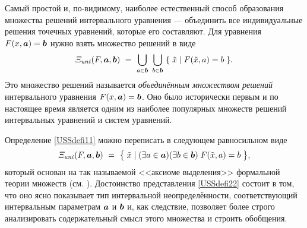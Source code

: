 \documentclass[a5paper,openany]{book}
\newcommand{\mbf}[1]{\protect\text{\boldmath$#1$}}
\newcommand{\USS}{\varXi_\mathit{\hspace{-0.5pt}uni}}
\begin{document}
Самый простой и, по-видимому, наиболее естественный способ образования множества 
решений интервального уравнения --- объединить все индивидуальные решения точечных 
уравнений, которые его составляют. Для уравнения $F(x, \mbf{a}) = \mbf{b}$ нужно 
взять множество решений в виде 
\begin{equation} 
\label{USSdefi11} 
\USS (F, \mbf{a}, \mbf{b}) \  = \  
   \bigcup_{a\in\mbf{b}} \  \bigcup_{b\in\mbf{b}} \  
   \{\; \tilde{x} \mid F(\tilde{x}, a) = b \;\}. 
\end{equation} 
Это множество решений называется \emph{объединённым множеством решений} интервального 
уравнения $F(x, \mbf{a}) = \mbf{b}$. Оно было 
исторически первым и по настоящее время является одним из наиболее популярных 
множеств решений интервальных уравнений и систем уравнений. 
  
Определение \eqref{USSdefi11} можно переписать в следующем равносильном виде 
\begin{equation} 
\label{USSdefi22} 
\USS (F, \mbf{a}, \mbf{b}) \  = \   \bigl\{\; \tilde{x} 
   \mid (\exists a\in\mbf{a})(\exists b\in\mbf{b})\; F(\tilde{x}, a) = b \;\bigr\}, 
\end{equation} 
который основан на так называемой <<аксиоме выделения>> формальной теории множеств 
(см. \cite{Kleene,Uspenskii}). Достоинство представления \eqref{USSdefi22} состоит 
в том, что оно ясно показывает тип интервальной неопределённости, соответствующий 
интервальным параметрам $\mbf{a}$ и $\mbf{b}$ и, как следствие, позволяет более 
строго анализировать содержательный смысл этого множества и строить обобщения. 
  
\end{document}
